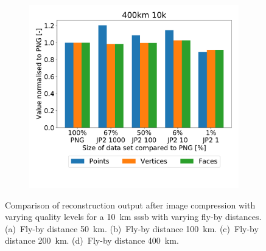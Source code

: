 \begin{figure}[htb]
\begin{subfigure}[b]{0.49\textwidth}
            \caption{}
            \label{fig:recon_120_200_10}
        \end{subfigure}
        \begin{subfigure}[b]{0.49\textwidth}
            \centering
            \includegraphics[width=\textwidth]{doc/thesis/0_figures/recon/400km_10k}
            \caption{}
            \label{fig:recon_120_400_10}
        \end{subfigure}
    \caption{Comparison of reconstruction output after image compression with varying quality levels for a \SI{10}{\kilo\meter} \gls{sssb} with varying fly-by distances. (a)~Fly-by distance \SI{50}{\kilo\meter}. (b)~Fly-by distance \SI{100}{\kilo\meter}. (c)~Fly-by distance \SI{200}{\kilo\meter}. (d)~Fly-by distance \SI{400}{\kilo\meter}.}
    \label{fig:recon_stats_10}
\end{figure}


